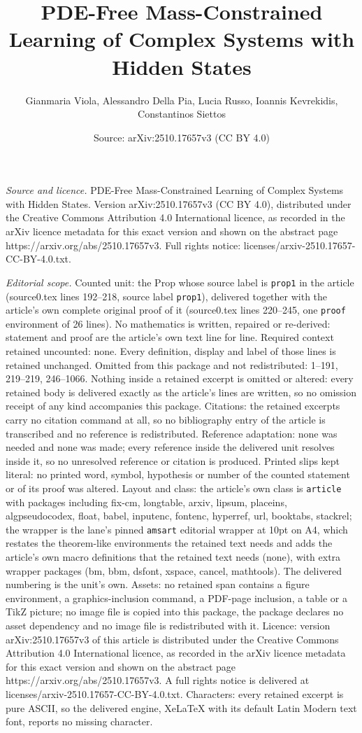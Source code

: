 \documentclass[10pt,a4paper]{amsart}
\title[PDE-Free Mass-Constrained Learning of Complex Systems with H]{PDE-Free Mass-Constrained Learning of Complex Systems with Hidden States}
\author{Gianmaria Viola, Alessandro Della Pia, Lucia Russo, Ioannis Kevrekidis, Constantinos Siettos}
\date{Source: arXiv:2510.17657v3 (CC BY 4.0)}
\begin{document}
\maketitle

\noindent\emph{Source and licence.} PDE-Free Mass-Constrained Learning of Complex Systems with Hidden States. Version arXiv:2510.17657v3 (CC BY 4.0), distributed under the Creative Commons Attribution 4.0 International licence, as recorded in the arXiv licence metadata for this exact version and shown on the abstract page https://arxiv.org/abs/2510.17657v3. Full rights notice: licenses/arxiv-2510.17657-CC-BY-4.0.txt.\par\smallskip

\noindent\textit{Editorial scope.} Counted unit: the Prop whose source label is \texttt{prop1} in the article (source0.tex lines 192--218, source label \texttt{prop1}), delivered together with the article's own complete original proof of it (source0.tex lines 220--245, one \texttt{proof} environment of 26 lines). No mathematics is written, repaired or re-derived: statement and proof are the article's own text line for line. Required context retained uncounted: none. Every definition, display and label of those lines is retained unchanged. Omitted from this package and not redistributed: 1--191, 219--219, 246--1066. Nothing inside a retained excerpt is omitted or altered: every retained body is delivered exactly as the article's lines are written, so no omission receipt of any kind accompanies this package. Citations: the retained excerpts carry no citation command at all, so no bibliography entry of the article is transcribed and no reference is redistributed. Reference adaptation: none was needed and none was made; every reference inside the delivered unit resolves inside it, so no unresolved reference or citation is produced. Printed slips kept literal: no printed word, symbol, hypothesis or number of the counted statement or of its proof was altered. Layout and class: the article's own class is \texttt{article} with packages including fix-cm, longtable, arxiv, lipsum, placeins, algpseudocodex, float, babel, inputenc, fontenc, hyperref, url, booktabs, stackrel; the wrapper is the lane's pinned \texttt{amsart} editorial wrapper at 10pt on A4, which restates the theorem-like environments the retained text needs and adds the article's own macro definitions that the retained text needs (none), with extra wrapper packages (bm, bbm, dsfont, xspace, cancel, mathtools). The delivered numbering is the unit's own. Assets: no retained span contains a figure environment, a graphics-inclusion command, a PDF-page inclusion, a table or a TikZ picture; no image file is copied into this package, the package declares no asset dependency and no image file is redistributed with it. Licence: version arXiv:2510.17657v3 of this article is distributed under the Creative Commons Attribution 4.0 International licence, as recorded in the arXiv licence metadata for this exact version and shown on the abstract page https://arxiv.org/abs/2510.17657v3. A full rights notice is delivered at licenses/arxiv-2510.17657-CC-BY-4.0.txt. Characters: every retained excerpt is pure ASCII, so the delivered engine, XeLaTeX with its default Latin Modern text font, reports no missing character.
\end{document}
